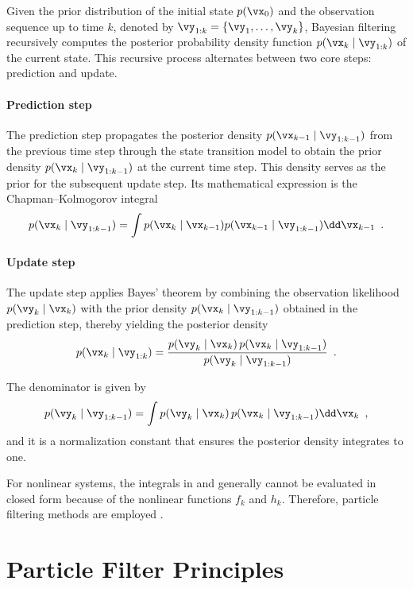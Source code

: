 Given the prior distribution of the initial state $p(\vx_0)$ and the observation sequence up to time $k$, denoted by $\vy_{1:k} = \{\vy_1, \dots, \vy_k\}$, Bayesian filtering recursively computes the posterior probability density function $p(\vx_k \mid \vy_{1:k})$ of the current state. This recursive process alternates between two core steps: prediction and update.

\paragraph{Prediction step}

The prediction step propagates the posterior density $p(\vx_{k-1} \mid \vy_{1:k-1})$ from the previous time step through the state transition model to obtain the prior density $p(\vx_k \mid \vy_{1:k-1})$ at the current time step. This density serves as the prior for the subsequent update step. Its mathematical expression is the Chapman--Kolmogorov integral
\begin{equation}
	p(\vx_k \mid \vy_{1:k-1}) = \int p(\vx_k \mid \vx_{k-1}) p(\vx_{k-1} \mid \vy_{1:k-1}) \dd\vx_{k-1}
	\label{eq:chapman_kolmogorov}\enspace.
\end{equation}

\paragraph{Update step}

The update step applies Bayes' theorem by combining the observation likelihood $p(\vy_k \mid \vx_k)$ with the prior density $p(\vx_k \mid \vy_{1:k-1})$ obtained in the prediction step, thereby yielding the posterior density
\begin{equation}
	p(\vx_k \mid \vy_{1:k}) = \frac{p(\vy_k \mid \vx_k)\, p(\vx_k \mid \vy_{1:k-1})}{p(\vy_k \mid \vy_{1:k-1})}
	\label{eq:bayes_update}\enspace.
\end{equation}

The denominator is given by
\[
p(\vy_k \mid \vy_{1:k-1}) = \int p(\vy_k \mid \vx_k)\, p(\vx_k \mid \vy_{1:k-1}) \dd\vx_k\enspace,
\]
and it is a normalization constant that ensures the posterior density integrates to one.

For nonlinear systems, the integrals in  and  generally cannot be evaluated in closed form because of the nonlinear functions $f_k$ and $h_k$. Therefore, particle filtering methods are employed \cite{PF01}.

\section{Particle Filter Principles}
\label{sec:particle_filter_principles}

